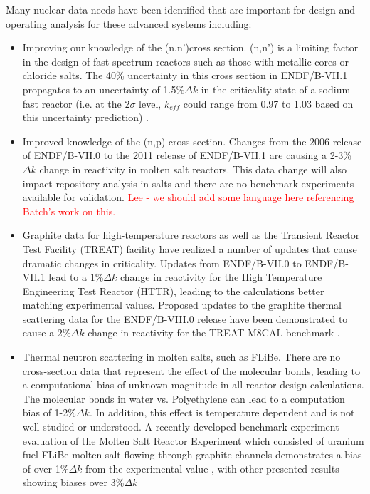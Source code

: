 \documentclass[letterpaper]{ar-1col}
\newcommand{\textred}[1]{\textcolor{red}{ #1}}
\begin{document}
Many nuclear data needs have been identified that are important for design and operating analysis for these advanced systems including:
\begin{itemize}
  \item Improving our knowledge of the (n,n')cross section.   (n,n') is a limiting factor in the design of fast spectrum reactors such as those with metallic cores or chloride salts. The 40\% uncertainty in this cross section in ENDF/B-VII.1 propagates to an uncertainty of 1.5\%$\Delta k$ in the criticality state of a sodium fast reactor (i.e. at the 2$\sigma$ level, $k_{eff}$ could range from 0.97 to 1.03 based on this uncertainty prediction) \cite{touran2016sensitivities}.
  \item Improved knowledge of the (n,p) cross section.  Changes from the 2006 release of ENDF/B-VII.0 to the 2011 release of ENDF/B-VII.1 are causing a 2-3\%$\Delta k$ change in reactivity in molten salt reactors. This data change will also impact repository analysis in salts and there are no benchmark experiments available for validation. \textred{Lee - we should add some language here referencing Batch's work on this.}
  \item Graphite data for high-temperature reactors as well as the Transient Reactor Test Facility (TREAT) facility have realized a number of updates that cause dramatic changes in criticality. Updates from ENDF/B-VII.0 to ENDF/B-VII.1 lead to a 1\%$\Delta k$ change in reactivity for the High Temperature Engineering Test Reactor (HTTR), leading to the calculations better matching experimental values. Proposed updates to the graphite thermal scattering data for the ENDF/B-VIII.0 release have been demonstrated to cause a 2\%$\Delta k$ change in reactivity for the TREAT M8CAL benchmark \cite{hawarithermal}.
  \item Thermal neutron scattering in molten salts, such as FLiBe. There are no cross-section data that represent the effect of the molecular bonds, leading to a computational bias of unknown magnitude in all reactor design calculations. The molecular bonds in water vs. Polyethylene can lead to a computation bias of 1-2\%$\Delta k$.  In addition, this effect is temperature dependent and is not well studied or understood. A recently developed benchmark experiment evaluation of the Molten Salt Reactor Experiment which consisted of uranium fuel FLiBe molten salt flowing through graphite channels demonstrates a bias of over 1\%$\Delta k$ from the experimental value \cite{shenzero}, with other presented results showing biases over 3\%$\Delta k$

\end{itemize}
\end{document}
